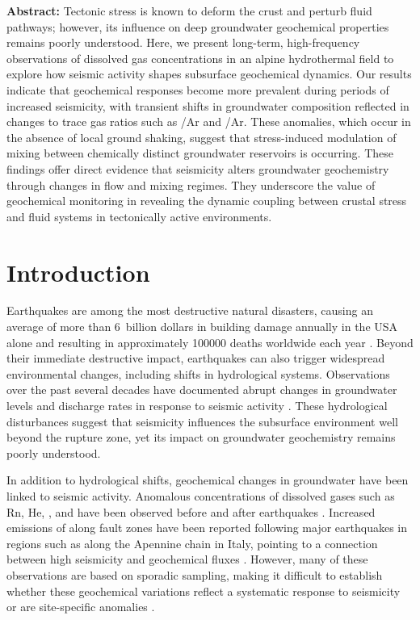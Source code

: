 \noindent
\textbf{Abstract:} Tectonic stress is known to deform the crust and perturb fluid pathways; however, its influence on deep groundwater geochemical properties remains poorly understood.
Here, we present long-term, high-frequency observations of dissolved gas concentrations in an alpine hydrothermal field to explore how seismic activity shapes subsurface geochemical dynamics.
Our results indicate that geochemical responses become more prevalent during periods of increased seismicity, with transient shifts in groundwater composition reflected in changes to trace gas ratios such as /Ar and /Ar.
These anomalies, which occur in the absence of local ground shaking, suggest that stress-induced modulation of mixing between chemically distinct groundwater reservoirs is occurring.
These findings offer direct evidence that seismicity alters groundwater geochemistry through changes in flow and mixing regimes.
They underscore the value of geochemical monitoring in revealing the dynamic coupling between crustal stress and fluid systems in tectonically active environments.

\section{Introduction}
Earthquakes are among the most destructive natural disasters, causing an average of more than $6$~billion dollars in building damage annually in the USA alone and resulting in approximately \num{100000} deaths worldwide each year \citep{bilham2004urban, fema2017hazus}.
Beyond their immediate destructive impact, earthquakes can also trigger widespread environmental changes, including shifts in hydrological systems.
Observations over the past several decades have documented abrupt changes in groundwater levels and discharge rates in response to seismic activity \citep{shi2013coseismic, montgomery2003streamflow, king2002earthquake, curzi2024fossil}.
These hydrological disturbances suggest that seismicity influences the subsurface environment well beyond the rupture zone, yet its impact on groundwater geochemistry remains poorly understood.

In addition to hydrological shifts, geochemical changes in groundwater have been linked to seismic activity.
Anomalous concentrations of dissolved gases such as Rn, He, , and  have been observed before and after earthquakes \citep{segovia1989radon, igarashi1995radon, toutain1999seismo, gunatilake2023japan, sano2016kumamoto}.
Increased emissions of  along fault zones have been reported following major earthquakes in regions such as along the Apennine chain in Italy, pointing to a connection between high seismicity and geochemical fluxes \citep{chiodini2020co2, curzi2024fossil}.
However, many of these observations are based on sporadic sampling, making it difficult to establish whether these geochemical variations reflect a systematic response to seismicity or are site-specific anomalies \citep{toutain1999seismo}.


